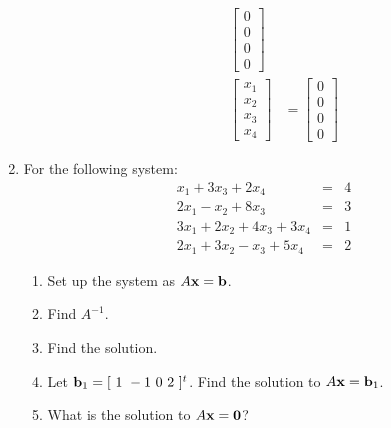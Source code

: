 \begin{enumerate}
\begin{description}
\begin{align*}
\left [\begin{array}{r}0\\
                       0\\
                       0\\
                       0
\end{array} \right]\\
\left[ \begin{array}{r}x_{1}\\
                       x_{2}\\
                       x_{3}\\
                       x_{4}
\end{array} \right ] &=
\left[ \begin{array}{r}0\\
                       0\\
                       0\\
                       0
\end{array} \right]
\end{align*}
\end{description}

\item For the following system:
$$
\begin{array}{rrr} x_1+3x_3+2x_4&=&4\\
                   2x_1-x_2+8x_3&=&3\\
                   3x_1+2x_2+4x_3+3x_4&=&1\\
                   2x_1+3x_2-x_3+5x_4&=&2
\end{array}
$$
\begin{enumerate}
\item Set up the system as $A{\bf x}={\bf b}$.
\item Find $A^{-1}.$
\item Find the solution.
\item Let ${\bf b}_1=[ \ 1 \ -1 \ 0 \ 2 \ ]^t$. Find the solution
to $A{\bf x}={\bf  b}_1$.
\item What is the solution to $A{\bf x}={\bf 0}$?
\end{enumerate}


\end{enumerate}
